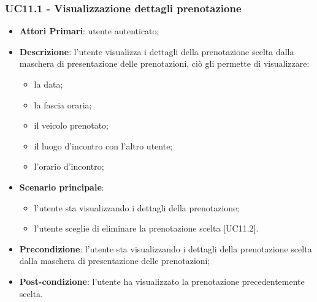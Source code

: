  \subsubsection{UC11.1 - Visualizzazione dettagli prenotazione}
\begin{itemize}
	\item \textbf{Attori Primari}: utente autenticato;
	\item \textbf{Descrizione}: l'utente visualizza i dettagli della prenotazione scelta dalla maschera di presentazione delle prenotazioni, ciò gli permette di visualizzare:
	\begin{itemize}
		\item la data;
		\item la fascia oraria;
		\item il veicolo prenotato;
		\item il luogo d'incontro con l'altro utente;
		\item l'orario d'incontro;
	\end{itemize}
	\item \textbf{Scenario principale}:
	\begin{itemize}
		\item l'utente sta visualizzando i dettagli della prenotazione;
		\item l'utente sceglie di eliminare la prenotazione scelta [UC11.2].
	\end{itemize}
	\item \textbf{Precondizione}: l'utente sta visualizzando i dettagli della prenotazione scelta dalla maschera di presentazione delle prenotazioni;
	\item \textbf{Post-condizione}: l'utente ha visualizzato la prenotazione precedentemente scelta.
\end{itemize}

